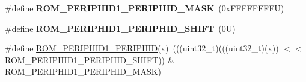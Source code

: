 \begin{DoxyCompactItemize}
\mbox{\label{group___m_t_b___register___masks_ga89bae76549b2b639d154bbab60fa87a6}} 
\#define {\bfseries R\+O\+M\+\_\+\+P\+E\+R\+I\+P\+H\+I\+D1\+\_\+\+P\+E\+R\+I\+P\+H\+I\+D\+\_\+\+M\+A\+SK}~(0x\+F\+F\+F\+F\+F\+F\+F\+F\+U)
\item 
\mbox{\label{group___m_t_b___register___masks_ga9370b3491eef6cf277f1b64339d4cacf}} 
\#define {\bfseries R\+O\+M\+\_\+\+P\+E\+R\+I\+P\+H\+I\+D1\+\_\+\+P\+E\+R\+I\+P\+H\+I\+D\+\_\+\+S\+H\+I\+FT}~(0\+U)
\item 
\#define \mbox{\hyperlink{group___m_t_b___register___masks_ga67e3b02a049c4ac0c8f3d065175e655e}{R\+O\+M\+\_\+\+P\+E\+R\+I\+P\+H\+I\+D1\+\_\+\+P\+E\+R\+I\+P\+H\+ID}}(x)~(((uint32\+\_\+t)(((uint32\+\_\+t)(x)) $<$$<$ R\+O\+M\+\_\+\+P\+E\+R\+I\+P\+H\+I\+D1\+\_\+\+P\+E\+R\+I\+P\+H\+I\+D\+\_\+\+S\+H\+I\+FT)) \& R\+O\+M\+\_\+\+P\+E\+R\+I\+P\+H\+I\+D1\+\_\+\+P\+E\+R\+I\+P\+H\+I\+D\+\_\+\+M\+A\+SK)
\end{DoxyCompactItemize}
